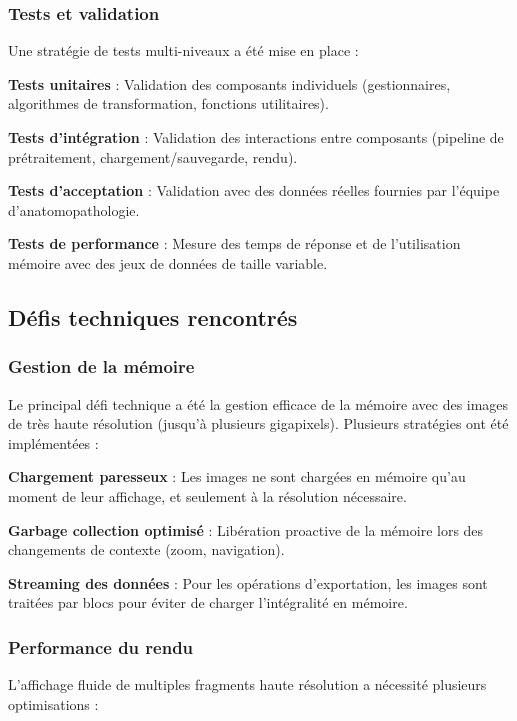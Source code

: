 \documentclass[12pt,a4paper]{report}
\begin{document}
\subsubsection{Tests et validation}

Une stratégie de tests multi-niveaux a été mise en place :

\textbf{Tests unitaires} : Validation des composants individuels (gestionnaires, algorithmes de transformation, fonctions utilitaires).

\textbf{Tests d'intégration} : Validation des interactions entre composants (pipeline de prétraitement, chargement/sauvegarde, rendu).

\textbf{Tests d'acceptation} : Validation avec des données réelles fournies par l'équipe d'anatomopathologie.

\textbf{Tests de performance} : Mesure des temps de réponse et de l'utilisation mémoire avec des jeux de données de taille variable.

\subsection{Défis techniques rencontrés}

\subsubsection{Gestion de la mémoire}

Le principal défi technique a été la gestion efficace de la mémoire avec des images de très haute résolution (jusqu'à plusieurs gigapixels). Plusieurs stratégies ont été implémentées :

\textbf{Chargement paresseux} : Les images ne sont chargées en mémoire qu'au moment de leur affichage, et seulement à la résolution nécessaire.

\textbf{Garbage collection optimisé} : Libération proactive de la mémoire lors des changements de contexte (zoom, navigation).

\textbf{Streaming des données} : Pour les opérations d'exportation, les images sont traitées par blocs pour éviter de charger l'intégralité en mémoire.

\subsubsection{Performance du rendu}

L'affichage fluide de multiples fragments haute résolution a nécessité plusieurs optimisations :
\end{document}
